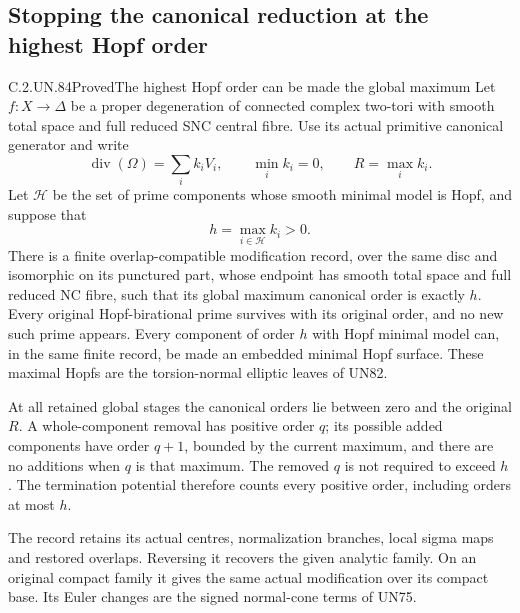 \subsection{Stopping the canonical reduction at the highest Hopf order}

\begin{statement}{C.2.UN.84}{Proved}{The highest Hopf order can be made the global maximum}
Let \(f:X\to\Delta\) be a proper degeneration of connected
complex two-tori with smooth total space and full reduced
SNC central fibre. Use its actual primitive canonical
generator and write
\[
 \operatorname{div}(\Omega)=\sum_i k_iV_i,\qquad
 \min_i k_i=0,\qquad R=\max_i k_i.
 \tag{C.TK.1}
\]
Let \(\mathcal H\) be the set of prime components whose
smooth minimal model is Hopf, and suppose that
\[
                  h=\max_{i\in\mathcal H}k_i>0.
 \tag{C.TK.2}
\]
There is a finite overlap-compatible modification record,
over the same disc and isomorphic on its punctured part,
whose endpoint has smooth total space and full reduced
NC fibre, such that its global maximum canonical order
is exactly \(h\). Every original Hopf-birational prime
survives with its original order, and no new such prime
appears. Every component of order \(h\) with Hopf minimal
model can, in the same finite record, be made an embedded
minimal Hopf surface. These maximal Hopfs are the
torsion-normal elliptic leaves of UN82.

At all retained global stages the canonical orders lie
between zero and the original \(R\). A whole-component
removal has positive order \(q\); its possible added
components have order \(q+1\), bounded by the current
maximum, and there are no additions when \(q\) is that
maximum. The removed \(q\) is not required to exceed
\(h\). The termination potential therefore counts every
positive order, including orders at most \(h\).

The record retains its actual centres, normalization
branches, local sigma maps and restored overlaps.
Reversing it recovers the given analytic family. On
an original compact family it gives the same actual
modification over its compact base. Its Euler changes
are the signed normal-cone terms of UN75.
\end{statement}


